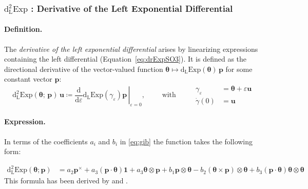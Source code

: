 %
%
%

\subsubsection{\texorpdfstring{\(\operatorname{d^2_{\scriptscriptstyle{L}}Exp}\)
: Derivative of the Left Exponential
Differential}{ddlExpSO3 : Derivative of the Left Exponential Differential}}\label{sec:ddlExpSO3}

\paragraph*{Definition.}

The \emph{derivative of the left exponential differential} arises by linearizing expressions containing the left differential (Equation~\ref{eq:drExpSO3}).
It is defined %
as the directional derivative of the vector-valued function \(\bm{\theta}\mapsto \operatorname{d_{\scriptscriptstyle{L}}Exp}(\bm{\theta})\,\bm{p}\) 
for some constant vector \(\bm{p}\):
%
\begin{equation*} 
\operatorname{d^2_{\scriptscriptstyle{L}}Exp}({\bm{\theta}}; \, \bm{p}) \, \bm{u} 
  \coloneq \left.\frac{\mathrm{d}}{\mathrm{d} \varepsilon}\left.\operatorname{d_{\scriptscriptstyle{L}}Exp} ({\gamma_{\varepsilon}})\right. \bm{p}\,\right|_{\varepsilon=0}
,\qquad\text{ with }\qquad
\begin{aligned}
\gamma_{\varepsilon} &= \bm{\theta} + \varepsilon \bm{u} \\
\dot{\gamma}(0) &= \bm{u}
\end{aligned}
\end{equation*}
 
\paragraph*{Expression.}

In terms of the coefficients \(a_i\) and \(b_i\) in \eqref{eq:gib}
the function takes the following form:

\begin{equation}
\begin{aligned}
\operatorname{d^2_{\scriptscriptstyle{L}}Exp}(\bm{\theta}; \bm{p})
&=
 a_2 \bm{p}^{\times}
 +a_3\left(\bm{p} \cdot \bm{\theta}\right)\mathbf{1}
 +a_3\left.\bm{\theta} \otimes \bm{p}\right.
 +b_1 \left.\bm{p} \otimes \bm{\theta}\right.
 -b_2 \left.(\bm{\theta} \times \bm{p}) \otimes \bm{\theta}\right.
 +b_3 \left(\bm{p} \cdot \bm{\theta}\right)\left.\bm{\theta} \otimes \bm{\theta}\right.
\end{aligned}
\label{eq:ddrExpSO3}\end{equation}
%
This formula has been derived by \cite{jelenić1998interpolation} and
\cite{ritto-corrêa2002differentiation}.


